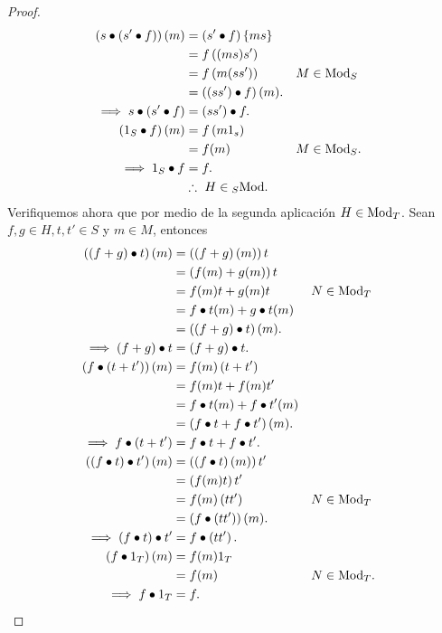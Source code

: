 \documentclass{article}
\newcommand{\lrprth}[1]{
	\left(#1\right)
}
\newcommand{\lrbrack}[1]{
	\left\{#1\right\}
}
\newcommand{\ringmod}[3]{
	\if#3l
	{}_{#1}#2
	\else
	\if#3r
	#2_{#1}
	\fi
	\fi
}
\theoremstyle{definition}
\theoremstyle{plain}
\theoremstyle{plain}
\theoremstyle{definition}
\theoremstyle{definition}
\theoremstyle{definition}
\theoremstyle{definition}
\theoremstyle{definition}
\theoremstyle{definition}
\begin{document}
\begin{enumerate}[label=\textbf{Ej \arabic*.}]
\begin{proof}
\begin{align*}
		\lrprth{s\bullet\lrprth{s'\bullet f}}(m)&=\lrprth{s'\bullet f}\lrbrack{ms}\\
		&=f\lrprth{(ms)s'}\\
		&=f\lrprth{m(ss')} && M\in\ringmod{S}{\text{Mod}}{r}\\
		&=\lrprth{\lrprth{ss'}\bullet f}(m).\\
		\implies s\bullet\lrprth{s'\bullet f}&= \lrprth{ss'}\bullet f.\\
		\lrprth{1_S\bullet f}(m)&=f\lrprth{m1_s}\\
		&=f(m) && M\in\ringmod{S}{\text{Mod}}{r}.\\
		\implies 1_S\bullet f&= f.\\
		&\therefore\ H\in\ringmod{S}{\text{Mod}}{l}.
	\end{align*} 
	Verifiquemos ahora que por medio de la segunda aplicación $H\in\ringmod{T}{\text{Mod}}{r}$. Sean $f,g\in H, t,t'\in S$ y $m\in M$, entonces
	\begin{align*}
		\lrprth{\lrprth{f+g}\bullet t}(m)&=\lrprth{\lrprth{f+g}(m)}t\\
		&=\lrprth{f(m)+g(m)}t\\
		&=f(m)t+g(m)t && N\in\ringmod{T}{\text{Mod}}{r}\\
		&=f\bullet t(m)+g\bullet t(m)\\
		&=\lrprth{\lrprth{f+g}\bullet t}(m).\\
		\implies \lrprth{f+g}\bullet t&= \lrprth{f+g}\bullet t.\\
		\lrprth{f\bullet\lrprth{t+t'}}(m)&=f(m)\lrprth{t+t'}\\
		&=f(m)t+f(m)t'\\
		&=f\bullet t(m)+ f\bullet t' (m)\\
		&=\lrprth{f\bullet t+ f\bullet t' }(m).\\
		\implies f\bullet\lrprth{t+t'}&= f\bullet t+ f\bullet t'.\\
		\lrprth{\lrprth{f\bullet t}\bullet t'}(m)&=\lrprth{\lrprth{f\bullet t}(m)}t'\\
		&=\lrprth{f(m)t}t'\\
		&=f(m)\lrprth{tt'} && N\in\ringmod{T}{\text{Mod}}{r}\\
		&=\lrprth{f\bullet\lrprth{tt'}}(m).\\
		\implies \lrprth{f\bullet t}\bullet t'&= f\bullet\lrprth{tt'}.\\
		\lrprth{f\bullet 1_T}(m)&=f(m)1_T\\
		&=f(m) && N\in\ringmod{T}{\text{Mod}}{r}.\\
		\implies f\bullet 1_T&= f.\\

\end{align*}
\end{proof}
\end{enumerate}
\end{document}
